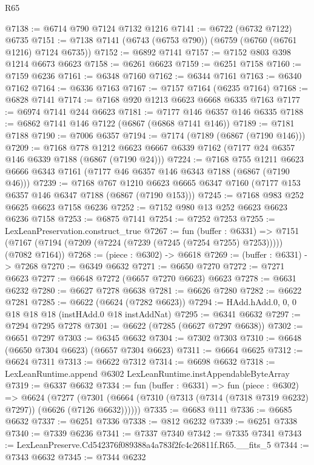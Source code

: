 \begin{lexlean}{R65}
\begin{coremodule}
{@7138 := @6714 @790 @7124 @7132 @1216
@7141 := @6722 (@6732 @7122) @6735
@7151 := @7138 @7141 (@6743 (@6753 @790)) (@6759 (@6760 (@6761 @1216) @7124 @6735))
@7152 := @6892 @7141
@7157 := @7152 @803 @398 @1214 @6673 @6623
@7158 := @6261 @6623
@7159 := @6251 @7158
@7160 := @7159 @6236
@7161 := @6348 @7160
@7162 := @6344 @7161
@7163 := @6340 @7162
@7164 := @6336 @7163
@7167 := @7157 @7164 (@6235 @7164)
@7168 := @6828 @7141
@7174 := @7168 @920 @1213 @6623 @6668 @6335 @7163
@7177 := @6974 @7141 @244 @6623
@7181 := @7177 @146 @6357 @146 @6335
@7188 := @6862 @7141 @146 @7122 (@6867 (@6868 @7141 @146))
@7189 := @7181 @7188
@7190 := @7006 @6357
@7194 := @7174 (@7189 (@6867 (@7190 @146)))
@7209 := @7168
    @778
    @1212
    @6623
    @6667
    @6339
    @7162
    (@7177 @24 @6357 @146 @6339 @7188 (@6867 (@7190 @24)))
@7224 := @7168
    @755
    @1211
    @6623
    @6666
    @6343
    @7161
    (@7177 @46 @6357 @146 @6343 @7188 (@6867 (@7190 @46)))
@7239 := @7168
    @767
    @1210
    @6623
    @6665
    @6347
    @7160
    (@7177 @153 @6357 @146 @6347 @7188 (@6867 (@7190 @153)))
@7245 := @7168 @983 @252 @6625 @6623 @7158 @6236
@7252 := @7152 @980 @13 @252 @6623 @6623 @6236 @7158
@7253 := @6875 @7141
@7254 := @7252 @7253
@7255 := LexLeanPreservation.construct_true
@7267 := fun (buffer : @6331) =>
  @7151 (@7167 (@7194 (@7209 (@7224 (@7239 (@7245 (@7254 @7255) @7253))))) (@7082 @7164))
@7268 := (piece : @6302) -> @6618
@7269 := (buffer : @6331) -> @7268
@7270 := @6349 @6632
@7271 := @6650 @7270
@7272 := @7271 @6623
@7277 := @6648 @7272 (@6657 @7270 @6623) @6623
@7278 := @6631 @6232
@7280 := @6627 @7278 @6638
@7281 := @6626 @7280
@7282 := @6622 @7281
@7285 := @6622 (@6624 (@7282 @6623))
@7294 := HAdd.hAdd.{0, 0, 0} @18 @18 @18 (instHAdd.{0} @18 instAddNat)
@7295 := @6341 @6632
@7297 := @7294 @7295 @7278
@7301 := @6622 (@7285 (@6627 @7297 @6638))
@7302 := @6651 @7297
@7303 := @6345 @6632
@7304 := @7302 @7303
@7310 := @6648 (@6650 @7304 @6623) (@6657 @7304 @6623)
@7311 := @6664 @6625
@7312 := @6624 @7311
@7313 := @6622 @7312
@7314 := @6698 @6632
@7318 := LexLeanRuntime.append @6302 LexLeanRuntime.instAppendableByteArray
@7319 := @6337 @6632
@7334 := fun (buffer : @6331) =>
  fun (piece : @6302) =>
  @6624
    (@7277 (@7301 (@6664 (@7310 (@7313 (@7314 (@7318 @7319 @6232) @7297)) (@6626 (@7126 @6632))))))
@7335 := @6683 @111
@7336 := @6685 @6632
@7337 := @6251 @7336
@7338 := @812 @6232
@7339 := @6251 @7338
@7340 := @7339 @6236
@7341 := @7337 @7340
@7342 := @7335 @7341
@7343 := LexLeanPreserve.Cd542376f089388a4a783f2fc4c26811f.R65.__fits_5
@7344 := @7343 @6632
@7345 := @7344 @6232
}
\end{coremodule}
\end{lexlean}
